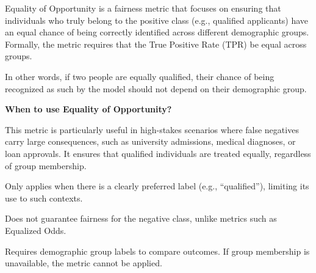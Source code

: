 Equality of Opportunity is a fairness metric that focuses on ensuring that individuals who truly belong to the positive class
(e.g., qualified applicants) have an equal chance of being correctly identified across different demographic groups.
Formally, the metric requires that the True Positive Rate (TPR) be equal across groups.

\begin{center}
\end{center}

In other words, if two people are equally qualified, their chance of being recognized as such by the model should not depend on their
demographic group.

\textbf{When to use Equality of Opportunity?}

This metric is particularly useful in high-stakes scenarios where false negatives carry large consequences, such as university admissions,
medical diagnoses, or loan approvals. It ensures that qualified individuals are treated equally, regardless of group membership.

{
\item Only applies when there is a clearly preferred label (e.g., “qualified”), limiting its use to such contexts.
\item Does not guarantee fairness for the negative class, unlike metrics such as Equalized Odds.
\item Requires demographic group labels to compare outcomes. If group membership is unavailable, the metric cannot be applied.
}

